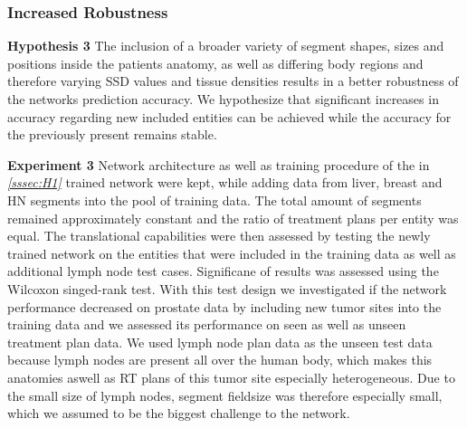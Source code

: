 \subsubsection{Increased Robustness}\label{sssec:H3}
\begin{hanginglist}\itemsep2pt

    \item\textbf{Hypothesis 3}\newline
    The inclusion of a broader variety of segment shapes, sizes and positions inside the patients anatomy, as well as differing body regions and therefore varying \acs{SSD} values and tissue densities results in a better robustness of the networks prediction accuracy.
    We hypothesize that significant increases in accuracy regarding new included entities can be achieved while the accuracy for the previously present remains stable.\\

    \item\textbf{Experiment 3}\newline
    Network architecture as well as training procedure of the in \emph{\ref{sssec:H1} } trained network were kept, while adding data from liver, breast and \acs{HN} segments into the pool of training data. 
    The total amount of segments remained approximately constant and the ratio of treatment plans per entity was equal.
    The translational capabilities were then assessed by testing the newly trained network on the entities that were included in the training data as well as additional lymph node test cases. 
    Significane of results was assessed using the Wilcoxon singed-rank test.
    With this test design we investigated if the network performance decreased on prostate data by including new tumor sites into the training data and we assessed its performance on seen as well as unseen treatment plan data.
    We used lymph node plan data as the unseen test data because lymph nodes are present all over the human body, which makes this anatomies aswell as \acs{RT} plans of this tumor site especially heterogeneous. 
    Due to the small size of lymph nodes, segment fieldsize was therefore especially small, which we assumed to be the biggest challenge to the network.\\

\end{hanginglist}

